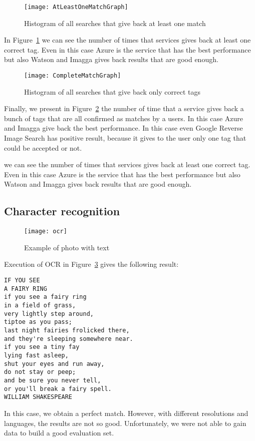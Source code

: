 \begin{figure}[H]
\centering
\texttt{[image: AtLeastOneMatchGraph]}
\caption{Histogram of all searches that give back at least one match}
\label{img:testatleastone}
\end{figure}

In Figure~\ref{img:testatleastone} we can see the number of times that services gives back at least one correct tag. Even in this case Azure is the service that has the best performance but also Watson and Imagga gives back results that are good enough.

\begin{figure}[H]
\centering
\texttt{[image: CompleteMatchGraph]}
\caption{Histogram of all searches that give back only correct tags}
\label{img:testcompletematch}
\end{figure}

Finally, we present in Figure~\ref{img:testcompletematch} the number of time that a service gives back a bunch of tags that are all confirmed as matches by a users. In this case Azure and Imagga give back the best performance. In this case even Google Reverse Image Search has positive result, because it gives to the user only one tag that could be accepted or not.

 we can see the number of times that services gives back at least one correct tag. Even in this case Azure is the service that has the best performance but also Watson and Imagga gives back results that are good enough.

\subsection{Character recognition}

\begin{figure}[H]
\centering
\texttt{[image: ocr]}
\caption{Example of photo with text}
\label{testOCR}
\end{figure}

Execution of OCR in Figure~\ref{testOCR} gives the following result:
\begin{lstlisting}
IF YOU SEE
A FAIRY RING
if you see a fairy ring
in a field of grass,
very lightly step around,
tiptoe as you pass;
last night fairies frolicked there,
and they're sleeping somewhere near.
if you see a tiny fay
lying fast asleep,
shut your eyes and run away,
do not stay or peep;
and be sure you never tell,
or you'll break a fairy spell.
WILLIAM SHAKESPEARE
\end{lstlisting}

In this case, we obtain a perfect match. However, with different resolutions and languages, the results are not so good. Unfortunately, we were not able to gain data to build a good evaluation set.